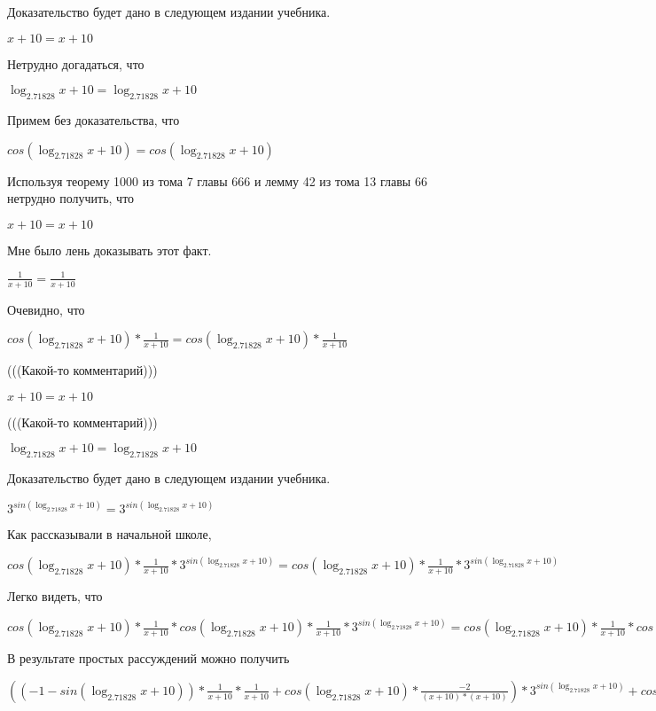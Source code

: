 \documentclass[12pt,a4paper,fleqn]{article}
\theoremstyle{definition}
\begin{document}
Доказательство будет дано в следующем издании учебника. 

$ x  +  10  =  x  +  10 $

Нетрудно догадаться, что 

$\log_{ 2.71828 }{ x  +  10 } = \log_{ 2.71828 }{ x  +  10 }$

Примем без доказательства, что 

$cos(\log_{ 2.71828 }{ x  +  10 }) = cos(\log_{ 2.71828 }{ x  +  10 })$

Используя теорему 1000 из тома 7 главы 666 и лемму 42 из тома 13 главы 66 нетрудно получить, что 

$ x  +  10  =  x  +  10 $

Мне было лень доказывать этот факт.

$\frac{ 1 }{ x  +  10 }
 = \frac{ 1 }{ x  +  10 }
$

Очевидно, что 

$cos(\log_{ 2.71828 }{ x  +  10 }) * \frac{ 1 }{ x  +  10 }
 = cos(\log_{ 2.71828 }{ x  +  10 }) * \frac{ 1 }{ x  +  10 }
$

(((Какой-то комментарий))) 

$ x  +  10  =  x  +  10 $

(((Какой-то комментарий))) 

$\log_{ 2.71828 }{ x  +  10 } = \log_{ 2.71828 }{ x  +  10 }$

Доказательство будет дано в следующем издании учебника. 

${ 3 }^{sin(\log_{ 2.71828 }{ x  +  10 })} = { 3 }^{sin(\log_{ 2.71828 }{ x  +  10 })}$

Как рассказывали в начальной школе, 

$cos(\log_{ 2.71828 }{ x  +  10 }) * \frac{ 1 }{ x  +  10 }
 * { 3 }^{sin(\log_{ 2.71828 }{ x  +  10 })} = cos(\log_{ 2.71828 }{ x  +  10 }) * \frac{ 1 }{ x  +  10 }
 * { 3 }^{sin(\log_{ 2.71828 }{ x  +  10 })}$

Легко видеть, что 

$cos(\log_{ 2.71828 }{ x  +  10 }) * \frac{ 1 }{ x  +  10 }
 * cos(\log_{ 2.71828 }{ x  +  10 }) * \frac{ 1 }{ x  +  10 }
 * { 3 }^{sin(\log_{ 2.71828 }{ x  +  10 })} = cos(\log_{ 2.71828 }{ x  +  10 }) * \frac{ 1 }{ x  +  10 }
 * cos(\log_{ 2.71828 }{ x  +  10 }) * \frac{ 1 }{ x  +  10 }
 * { 3 }^{sin(\log_{ 2.71828 }{ x  +  10 })}$

В результате простых рассуждений можно получить 

$(( -1  - sin(\log_{ 2.71828 }{ x  +  10 })) * \frac{ 1 }{ x  +  10 }
 * \frac{ 1 }{ x  +  10 }
 + cos(\log_{ 2.71828 }{ x  +  10 }) * \frac{ -2 }{( x  +  10 ) * ( x  +  10 )}
) * { 3 }^{sin(\log_{ 2.71828 }{ x  +  10 })} + cos(\log_{ 2.71828 }{ x  +  10 }) * \frac{ 1 }{ x  +  10 }
 * cos(\log_{ 2.71828 }{ x  +  10 }) * \frac{ 1 }{ x  +  10 }
 * { 3 }^{sin(\log_{ 2.71828 }{ x  +  10 })} = (( -1  - sin(\log_{ 2.71828 }{ x  +  10 })) * \frac{ 1 }{ x  +  10 }
 * \frac{ 1 }{ x  +  10 }
 + cos(\log_{ 2.71828 }{ x  +  10 }) * \frac{ -2 }{( x  +  10 ) * ( x  +  10 )}
) * { 3 }^{sin(\log_{ 2.71828 }{ x  +  10 })} + cos(\log_{ 2.71828 }{ x  +  10 }) * \frac{ 1 }{ x  +  10 }
 * cos(\log_{ 2.71828 }{ x  +  10 }) * \frac{ 1 }{ x  +  10 }
 * { 3 }^{sin(\log_{ 2.71828 }{ x  +  10 })}$
\end{document}
